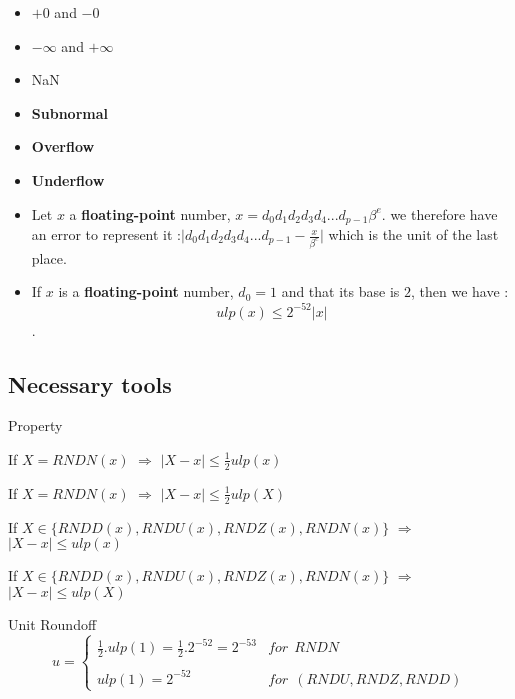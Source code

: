 \begin{frame}
    \begin{itemize}
    \item  $+0$ and $-0$
    \item $-\infty$ and $+\infty$
    \item NaN 
    \item \textbf{Subnormal} 
    \item   \textbf{Overflow} 
    \item \textbf{Underflow}  
\end{itemize} 
\end{frame}
\begin{frame}
\begin{itemize}
    \item <1-> 
\begin{defin}  
 Let $x$ a \textbf{floating-point} number, $x = d_0d_1d_2d_3d_4...d_{p-1}\beta^e$. we therefore have an error to represent it :$\lvert d_0d_1d_2d_3d_4...d_{p-1} - \frac{x}{\beta^e} \rvert $ which is the unit of the last place.
\end{defin}
\item <2->
    \begin{coroll}
If $x$ is a \textbf{floating-point} number, $d_0 = 1$ and that its base is $2$, then we have :
$$ulp(x) \le 2^{-52} \lvert x \rvert$$.
\end{coroll}
\end{itemize}
\end{frame}

\subsection{Necessary tools}
\begin{frame}{Property}

\begin{prope}
 If $X = RNDN(x)$ $\Rightarrow$ $\vert X - x \rvert \le \frac{1}{2}ulp(x)$
\end{prope}

\begin{prope} 
If $X = RNDN(x)$ $\Rightarrow$ $\vert X - x \rvert \le \frac{1}{2}ulp(X)$
\end{prope}

\begin{prope}  
If $X \in \{ RNDD(x), RNDU(x), RNDZ(x), RNDN(x)\} $ $\Rightarrow$ $\vert X - x \rvert \le ulp(x)$
\end{prope}

\begin{prope}
If $X \in \{ RNDD(x), RNDU(x),RNDZ(x), RNDN(x)\} $ $\Rightarrow$ $\vert X - x \rvert \le ulp(X)$
\end{prope}
\end{frame}
\begin{frame}{Unit Roundoff}
$$
    u = \left\{
\begin{array}{ll}
    \frac{1}{2}.ulp(1) = \frac{1}{2}.2^{-52} = 2^{-53}& for \  \ RNDN \\
    \ & \ \\
     ulp(1) = 2^{-52} & for \  \ (RNDU, RNDZ, RNDD)
\end{array}
\right.
$$
\end{frame}

